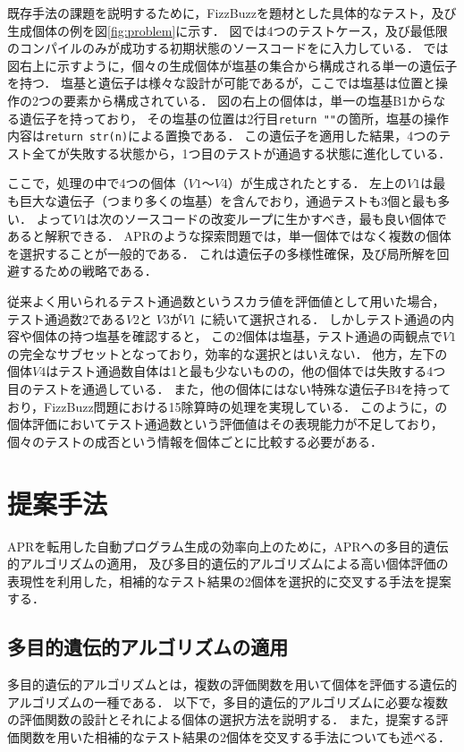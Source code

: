 \documentclass[uplatex,dvipdfmx,a4paper]{jsarticle}
\let\oldcite\cite
\renewcommand{\cite}[1]{\xspace\oldcite{#1}}
\begin{document}
既存手法の課題を説明するために，FizzBuzzを題材とした具体的なテスト，及び生成個体の例を図\ref{fig:problem}に示す．
図では4つのテストケース，及び最低限のコンパイルのみが成功する初期状態のソースコードを\apr に入力している．
\apr では図右上に示すように，個々の生成個体が塩基の集合から構成される単一の遺伝子を持つ．
塩基と遺伝子は様々な設計が可能であるが，ここでは塩基は位置と操作の2つの要素から構成されている．
図の右上の個体は，単一の塩基B1からなる遺伝子を持っており，
その塩基の位置は2行目\verb|return ""|の箇所，塩基の操作内容は\verb|return str(n)|による置換である．
この遺伝子を適用した結果，4つのテスト全てが失敗する状態から，1つ目のテストが通過する状態に進化している．

ここで，\apr 処理の中で4つの個体（$V1$～$V4$）が生成されたとする．
左上の$V1$は最も巨大な遺伝子（つまり多くの塩基）を含んでおり，通過テストも3個と最も多い．
よって$V1$は次のソースコードの改変ループに生かすべき，最も良い個体であると解釈できる．
APRのような探索問題では，単一個体ではなく複数の個体を選択することが一般的である．
これは遺伝子の多様性確保，及び局所解を回避するための戦略である．

従来よく用いられるテスト通過数というスカラ値を評価値として用いた場合，
テスト通過数2である$V2$と $V3$が$V1$ に続いて選択される．
しかしテスト通過の内容や個体の持つ塩基を確認すると，
この2個体は塩基，テスト通過の両観点で$V1$の完全なサブセットとなっており，効率的な選択とはいえない．
他方，左下の個体$V4$はテスト通過数自体は1と最も少ないものの，他の個体では失敗する4つ目のテストを通過している．
また，他の個体にはない特殊な遺伝子B4を持っており，FizzBuzz問題における15除算時の処理を実現している．
このように，\apr の個体評価においてテスト通過数という評価値はその表現能力が不足しており，
個々のテストの成否という情報を個体ごとに比較する必要がある．


\clearpage
\section{提案手法} \label{sec:prop}
APRを転用した自動プログラム生成の効率向上のために，APRへの多目的遺伝的アルゴリズムの適用，
及び多目的遺伝的アルゴリズムによる高い個体評価の表現性を利用した，相補的なテスト結果の2個体を選択的に交叉する手法を提案する．

\subsection{多目的遺伝的アルゴリズムの適用} \label{sec:moga}
多目的遺伝的アルゴリズムとは，複数の評価関数を用いて個体を評価する遺伝的アルゴリズムの一種である．
以下で，多目的遺伝的アルゴリズムに必要な複数の評価関数の設計とそれによる個体の選択方法を説明する．
また，提案する評価関数を用いた相補的なテスト結果の2個体を交叉する手法についても述べる．
\end{document}
